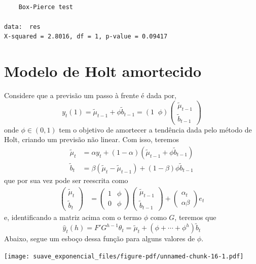 \documentclass[
  letterpaper,
  DIV=11,
  numbers=noendperiod]{scrartcl}
\theoremstyle{plain}
\theoremstyle{plain}
\theoremstyle{definition}
\theoremstyle{definition}
\theoremstyle{remark}
\begin{document}
\begin{verbatim}

    Box-Pierce test

data:  res
X-squared = 2.8016, df = 1, p-value = 0.09417
\end{verbatim}

\hypertarget{modelo-de-holt-amortecido}{%
\section{Modelo de Holt amortecido}\label{modelo-de-holt-amortecido}}

Considere que a previsão um passo à frente é dada por,
\[y_{t}(1)=\tilde{\mu}_{t-1}+\phi\tilde{b}_{t-1}=(1\;\;\phi)\left(\begin{array}{c}\tilde{\mu}_{t-1}\\ \tilde{b}_{t-1}\end{array}\right)\]
onde \(\phi\in(0,1)\) tem o objetivo de amortecer a tendência dada pelo
método de Holt, criando um previsão não linear. Com isso, teremos
\[\begin{align}
\tilde{\mu}_t &= \alpha y_t + (1-\alpha)(\tilde{\mu}_{t-1} + \phi\tilde{b}_{t-1})\\
\tilde{b}_t &= \beta(\tilde{\mu}_{t} - \tilde{\mu}_{t-1})+(1-\beta) \phi\tilde{b}_{t-1}
\end{align}\] que por sua vez pode ser reescrita como \[\begin{align}
\left(\begin{array}{c}\tilde{\mu}_t\\ \tilde{b}_t\end{array}\right) &= \left(\begin{array}{cc}1&\phi\\ 0 &\phi\end{array}\right)\left(\begin{array}{c}\tilde{\mu}_{t-1}\\ \tilde{b}_{t-1}\end{array}\right)+\left(\begin{array}{c}\alpha_t\\ \alpha\beta\end{array}\right)e_t\end{align}\]
e, identificando a matriz acima com o termo \(\phi\) como \(G\), teremos
que
\[\hat{y}_{t}(h)=F'G^{h-1}\theta_{t}=\tilde{\mu}_t+(\phi+\cdots+\phi^h)\tilde{b}_t\]
Abaixo, segue um esboço dessa função para alguns valores de \(\phi.\)

\texttt{[image: suave\_exponencial\_files/figure-pdf/unnamed-chunk-16-1.pdf]}
\end{document}
